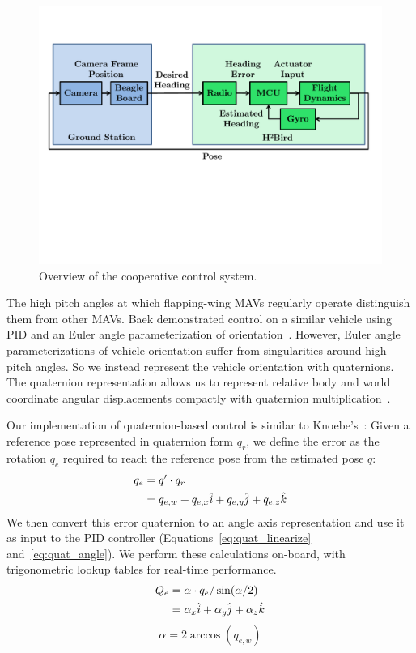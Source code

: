 \documentclass{aamas2013}
\begin{document}
\begin{figure}[tb]
\centering
\includegraphics[width=\linewidth]{figures/process_flow.pdf}
\caption{Overview of the cooperative control system.}
\label{fig:process_flow}
\end{figure}

The high pitch angles at which flapping-wing MAVs regularly operate 
distinguish them from other MAVs. Baek demonstrated control on a similar 
vehicle using PID and an Euler angle parameterization of orientation~\cite{baek:tracking}. 
However, Euler angle parameterizations of vehicle orientation suffer from 
singularities around high pitch angles. So we instead represent the vehicle 
orientation with quaternions. The quaternion representation allows us to 
represent relative body and world coordinate angular displacements compactly 
with quaternion multiplication~\cite{hamilton1866elements}.

Our implementation of quaternion-based control is similar to 
Knoebe's~\cite{knoebe:quatcontrol}:
Given a reference pose represented in quaternion form $q_r$, we define the 
error as the rotation $q_e$ required to reach the reference pose from the 
estimated pose $q$:
\begin{align}
\label{eq:quat_error}
q_e &= q^{\prime}\cdot q_r \\
		&= q_{e,w} + q_{e,x}\hat{i} + q_{e,y}\hat{j} + q_{e,z}\hat{k} \notag 
\end{align}
We then convert this error quaternion to an angle axis representation and 
use it as input to the PID controller (Equations~\ref{eq:quat_linearize} and~\ref{eq:quat_angle}).
We perform these calculations on-board, with trigonometric lookup tables for 
real-time performance.
\begin{align}
\label{eq:quat_linearize}
Q_e &= \alpha\cdot q_e/\sin(\alpha /2) \\
		&= \alpha_{x}\hat{i} + \alpha_{y}\hat{j} + \alpha_{z}\hat{k} \notag
\end{align}
\begin{equation}
\label{eq:quat_angle}
\alpha = 2\arccos(q_{e,w})
\end{equation}
\end{document}
